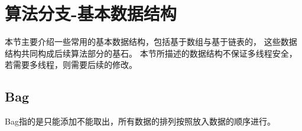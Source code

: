 \section{算法分支-基本数据结构}

本节主要介绍一些常用的基本数据结构，包括基于数组与基于链表的，
这些数据结构共同构成后续算法部分的基石。
本节所描述的数据结构不保证多线程安全，若需要多线程，则需要后续的修改。

\subsection{Bag}

Bag指的是只能添加不能取出，所有数据的排列按照放入数据的顺序进行。
